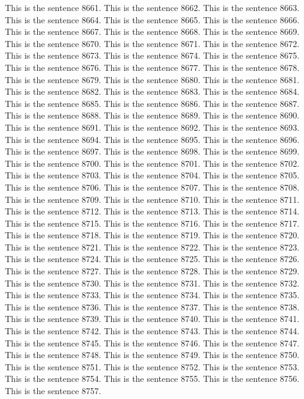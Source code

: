 \documentclass{article}
\begin{document}
This is the sentence 8661.
This is the sentence 8662.
This is the sentence 8663.
This is the sentence 8664.
This is the sentence 8665.
This is the sentence 8666.
This is the sentence 8667.
This is the sentence 8668.
This is the sentence 8669.
This is the sentence 8670.
This is the sentence 8671.
This is the sentence 8672.
This is the sentence 8673.
This is the sentence 8674.
This is the sentence 8675.
This is the sentence 8676.
This is the sentence 8677.
This is the sentence 8678.
This is the sentence 8679.
This is the sentence 8680.
This is the sentence 8681.
This is the sentence 8682.
This is the sentence 8683.
This is the sentence 8684.
This is the sentence 8685.
This is the sentence 8686.
This is the sentence 8687.
This is the sentence 8688.
This is the sentence 8689.
This is the sentence 8690.
This is the sentence 8691.
This is the sentence 8692.
This is the sentence 8693.
This is the sentence 8694.
This is the sentence 8695.
This is the sentence 8696.
This is the sentence 8697.
This is the sentence 8698.
This is the sentence 8699.
This is the sentence 8700.
This is the sentence 8701.
This is the sentence 8702.
This is the sentence 8703.
This is the sentence 8704.
This is the sentence 8705.
This is the sentence 8706.
This is the sentence 8707.
This is the sentence 8708.
This is the sentence 8709.
This is the sentence 8710.
This is the sentence 8711.
This is the sentence 8712.
This is the sentence 8713.
This is the sentence 8714.
This is the sentence 8715.
This is the sentence 8716.
This is the sentence 8717.
This is the sentence 8718.
This is the sentence 8719.
This is the sentence 8720.
This is the sentence 8721.
This is the sentence 8722.
This is the sentence 8723.
This is the sentence 8724.
This is the sentence 8725.
This is the sentence 8726.
This is the sentence 8727.
This is the sentence 8728.
This is the sentence 8729.
This is the sentence 8730.
This is the sentence 8731.
This is the sentence 8732.
This is the sentence 8733.
This is the sentence 8734.
This is the sentence 8735.
This is the sentence 8736.
This is the sentence 8737.
This is the sentence 8738.
This is the sentence 8739.
This is the sentence 8740.
This is the sentence 8741.
This is the sentence 8742.
This is the sentence 8743.
This is the sentence 8744.
This is the sentence 8745.
This is the sentence 8746.
This is the sentence 8747.
This is the sentence 8748.
This is the sentence 8749.
This is the sentence 8750.
This is the sentence 8751.
This is the sentence 8752.
This is the sentence 8753.
This is the sentence 8754.
This is the sentence 8755.
This is the sentence 8756.
This is the sentence 8757.
\end{document}
